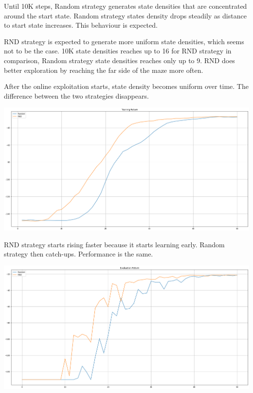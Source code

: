 \documentclass[11pt]{article}
\begin{document}
    Until 10K steps, Random strategy generates state densities that are concentrated around the start state.
    Random strategy states density drops steadily as distance to start state increases.
    This behaviour is expected.

    RND strategy is expected to generate more uniform state densities, which seems not to be the case.
    10K state densities reaches up to 16 for RND strategy in comparison, Random strategy state densities reaches only up to 9.
    RND does better exploration by reaching the far side of the maze more often.

    After the online exploitation starts, state density becomes uniform over time.
    The difference between the two strategies disappears.

    \hspace*{-0.6in}
    \includegraphics[scale=0.30]{p1/q1-medium-train-compare}

    RND strategy starts rising faster because it starts learning early.
    Random strategy then catch-ups.
    Performance is the same.

    \hspace*{-0.6in}
    \includegraphics[scale=0.30]{p1/q1-medium-eval-compare}
\end{document}
